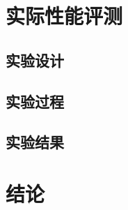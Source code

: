 \documentclass[UTF8]{ctexart}
\begin{document}
\section{实际性能评测}

\subsection{实验设计}

\subsection{实验过程}

\subsection{实验结果}

\section{结论}




\end{document}
